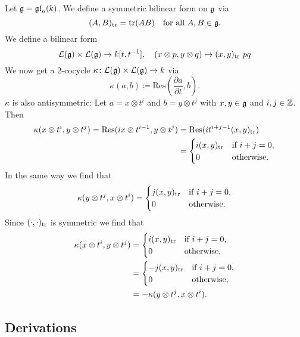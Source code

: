\begin{expl}
 Let $\mathfrak{g} = \mathfrak{gl}_n(k)$. We define a symmetric bilinear form on $\mathfrak{g}$ via
 \[
  (A,B)_{\operatorname{tr}} = \operatorname{tr}(AB) \quad \text{for all $A,B \in \mathfrak{g}$}.
 \]
 We define a bilinear form
 \[
  \mathcal{L}(\mathfrak{g}) \times \mathcal{L}(\mathfrak{g}) \to k[t,t^{-1}], \quad
  (x \otimes p, y \otimes q) \mapsto (x,y)_{\operatorname{tr}}\ pq
 \]
 We now get a $2$-cocycle $\kappa \colon \mathcal{L}(\mathfrak{g}) \times \mathcal{L}(\mathfrak{g}) \to k$ via
 \[
  \kappa(a,b) \coloneqq \mathrm{Res}\left(\frac{\partial a}{\partial t}, b\right).
 \]
 $\kappa$ is also antisymmetric: Let $a = x \otimes t^i$ and $b = y \otimes t^j$ with $x,y \in \mathfrak{g}$ and $i,j \in \mathbb{Z}$. Then
 \begin{align*}
  \kappa(x \otimes t^i, y \otimes t^j)
  = \mathrm{Res}(i x \otimes t^{i-1}, y \otimes t^j)
  &= \mathrm{Res}(i t^{i+j-1} (x,y)_{\operatorname{tr}}) \\
  &=
  \begin{cases}
   i (x,y)_{\operatorname{tr}} & \text{if $i+j = 0$}, \\
               0 & \text{otherwise}.
  \end{cases}
 \end{align*}
 In the same way we find that
 \[
  \kappa(y \otimes t^j, x \otimes t^i) =
  \begin{cases}
   j (x,y)_{\operatorname{tr}} & \text{if $i+j = 0$}, \\
               0 & \text{otherwise}.
  \end{cases}
 \]
 Since $(\cdot,\cdot)_{\operatorname{tr}}$ is symmetric we find that
 \begin{align*}
  \kappa(x \otimes t^i, y \otimes t^j)
  &=
  \begin{cases}
   i (x,y)_{\operatorname{tr}} & \text{if $i+j = 0$}, \\
               0 & \text{otherwise},
  \end{cases} \\
  &=
  \begin{cases}
   -j (x,y)_{\operatorname{tr}} & \text{if $i+j = 0$}, \\
                0 & \text{otherwise},
  \end{cases} \\
  &=
  -\kappa(y \otimes t^j, x \otimes t^i).
 \end{align*}
\end{expl}





\subsection{Derivations}


